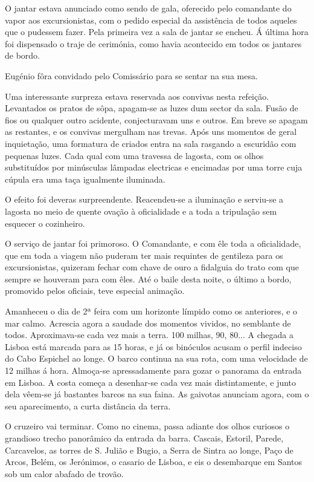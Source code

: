 \documentclass[9pt]{article}
\begin{document}
O jantar estava anunciado como sendo de gala, oferecido pelo comandante do vapor aos excursionistas, com o pedido especial da assistência de
todos aqueles que o pudessem fazer. Pela primeira vez a sala de jantar se
encheu. Á última hora foi dispensado o traje de cerimónia, como havia acontecido em todos os jantares de bordo.

Eugé\-nio fôra convidado pelo Comissário para se sentar na sua mesa.

Uma interessante surpreza estava reservada aos convivas nesta refei\-ção. Levantados os pratos de sôpa, apagam-se as luzes dum sector da sala. Fusão de fios ou qualquer outro acidente, conjecturavam uns e outros. Em breve se apagam as restantes, e os convivas mergu\-lham nas trevas. Após uns
momentos de geral inquieta\-ção, uma formatura de criados entra na sala rasgando a escuridão com pequenas luzes. Cada qual com uma travessa de lagosta, com os o\-lhos substituídos por minúsculas lâmpadas electricas e encimadas por uma torre cuja cúpula era uma taça igualmente iluminada.

O efeito foi deveras surpreendente. Reacendeu-se a ilumina\-ção e serviu-se a lagosta no meio de quente ova\-ção à oficialidade e a toda a tripula\-ção sem esque\-cer o cozinheiro.

O serviço de jantar foi primoroso. O Comandante, e com êle toda a oficialidade, que em toda a viagem não puderam ter mais requintes de gentileza para os excursionistas, quizeram fechar com chave de ouro a fidalguia
do trato com que sempre se houveram para com êles. Até o baile desta noite, o último a bordo, promovido pelos oficiais, teve especial anima\-ção.

Amanheceu o dia de 2ª feira com um horizonte límpido como os anteriores, e o mar calmo. Acrescia agora a saudade dos momentos vividos, no semblante de todos. Aproximava-se cada vez mais a terra. 100 mi\-lhas, 90, 80...
A chegada a Lisboa está marcada para as 15 horas, e já os binóculos acusam
o perfil indeciso do Cabo Espichel ao longe. O barco continua na sua rota,
com uma velocidade de 12 mi\-lhas á hora. Almoça-se apressadamente para gozar o panorama da entrada em Lisboa. A costa começa a desenhar-se cada
vez mais distintamente, e junto dela vêem-se já bastantes barcos na sua
faina. As gaivotas anunciam agora, com o seu aparecimento, a curta distância da terra.

O cruzeiro vai terminar. Como no cinema, passa adiante dos o\-lhos curiosos o grandioso trecho panorâmico da entrada da barra. Cascais, Estoril,
Parede, Carcavelos, as torres de S. Julião e Bugio, a Serra de Sintra ao longe, Paço de Arcos, Belém, os Jerónimos, o casario de Lisboa, e eis o desembarque em Santos sob um calor abafado de trovão.
\end{document}
